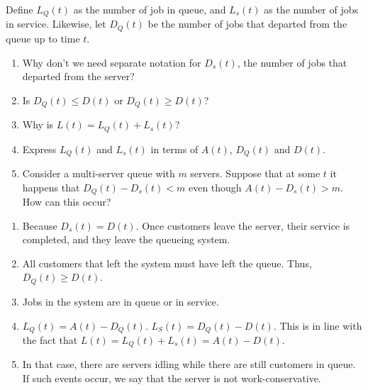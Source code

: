 \begin{question}
  Define $L_Q(t)$ as the number of job in queue, and $L_s(t)$ as the
  number of jobs in service. Likewise, let $D_Q(t)$ be the number of
  jobs that departed from the queue up to time $t$.
  \begin{enumerate}
  \item Why don't we need separate notation for $D_s(t)$, the number
    of jobs that departed from the server? 
  \item Is $D_Q(t) \leq D(t)$ or $D_Q(t) \geq D(t)$?
  \item Why is $L(t) = L_Q(t) + L_s(t)$?
  \item Express $L_Q(t)$ and $L_s(t)$ in terms of $A(t)$, $D_Q(t)$ and $D(t)$.
  \item Consider a multi-server queue with $m$ servers. Suppose that
    at some $t$ it happens that $D_Q(t) - D_s(t) < m$ even though
    $A(t) - D_s(t) > m$. How can this occur? 
  \end{enumerate}
\begin{solution}
  \begin{enumerate}
  \item Because $D_s(t) = D(t)$. Once customers leave the server,
    their service is completed, and they leave the queueing system.
  \item All customers that left the system must have left the
    queue. Thus, $D_Q(t) \geq D(t)$.
  \item Jobs in the system are in queue or in service.
  \item $L_Q(t) = A(t) - D_Q(t)$. $L_S(t) = D_Q(t) - D(t)$. This is in
    line with the fact that $L(t) = L_Q(t) + L_s(t) = A(t) - D(t)$.
  \item In that case, there are servers idling while there are still
    customers in queue. If such events occur, we say that the server
    is not work-conservative.
  \end{enumerate}
\end{solution}
\end{question}



